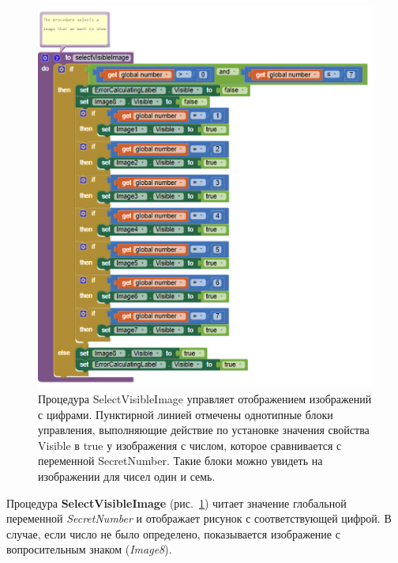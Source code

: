 \begin{figure}
  \includegraphics{./graphics/programs/guess_numbers/procedure_selectVisibleImage_AppInventor_2018.png}
    \caption[Процедура SelectVisibleImage.]{Процедура SelectVisibleImage управляет отображением изображений с цифрами. Пунктирной линией отмечены однотипные блоки управления, выполняющие действие по установке значения свойства Visible в true у изображения с числом, которое сравнивается с переменной SecretNumber. Такие блоки можно увидеть на изображении для чисел один и семь.}
  \label{fig:block:click:select:visible:image}
\end{figure}

Процедура \textbf{SelectVisibleImage} (рис.~\ref{fig:block:click:select:visible:image}) читает значение глобальной переменной \textit{SecretNumber} и отображает рисунок с соответствующей цифрой.
В случае, если число не было определено, показывается изображение с вопросительным знаком (\textit{Image8}).

